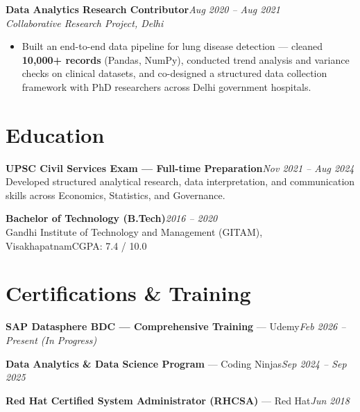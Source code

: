 \documentclass[10pt, letterpaper]{article}
\newcommand{\role}[3]{%
  \vspace{2pt}%
  {\bfseries #1}\hfill{\small\color{muted}\textit{#3}}\\[-2pt]%
  {\small\color{muted}\textit{#2}}%
}
\begin{document}
\role{Data Analytics Research Contributor}{Collaborative Research Project, Delhi}{Aug 2020 – Aug 2021}

\begin{itemize}
  \item Built an end-to-end data pipeline for lung disease detection — cleaned \textbf{10,000+ records} (Pandas, NumPy), conducted trend analysis and variance checks on clinical datasets, and co-designed a structured data collection framework with PhD researchers across Delhi government hospitals.
\end{itemize}

\section{Education}

{\bfseries UPSC Civil Services Exam — Full-time Preparation}\hfill{\small\color{muted}\textit{Nov 2021 – Aug 2024}}\\
{\small\color{muted}Developed structured analytical research, data interpretation, and communication skills across Economics, Statistics, and Governance.}

\vspace{2pt}
{\bfseries Bachelor of Technology (B.Tech)}\hfill{\small\color{muted}\textit{2016 – 2020}}\\
{\small\color{muted}Gandhi Institute of Technology and Management (GITAM), Visakhapatnam\hfill CGPA: 7.4 / 10.0}

\section{Certifications \& Training}

{\bfseries SAP Datasphere BDC — Comprehensive Training} — Udemy\hfill{\small\color{muted}\textit{Feb 2026 – Present \emph{(In Progress)}}}

\vspace{1pt}
{\bfseries Data Analytics \& Data Science Program} — Coding Ninjas\hfill{\small\color{muted}\textit{Sep 2024 – Sep 2025}}

\vspace{1pt}
{\bfseries Red Hat Certified System Administrator (RHCSA)} — Red Hat\hfill{\small\color{muted}\textit{Jun 2018}}

\end{document}
